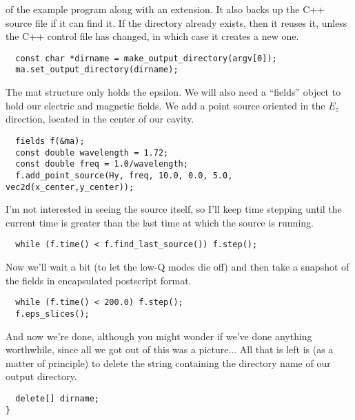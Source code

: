 of the example program along with an extension.  It also backs up the C++
source file if it can find it.  If the directory already exists, then it
reuses it, unless the C++ control file has changed, in which case it
creates a new one.
\begin{verbatim}
  const char *dirname = make_output_directory(argv[0]);
  ma.set_output_directory(dirname);
\end{verbatim}
The mat structure only holds the epsilon.  We will also need a ``fields''
object to hold our electric and magnetic fields.  We add a point source
oriented in the $E_z$ direction, located in the center of our cavity.
\begin{verbatim}
  fields f(&ma);
  const double wavelength = 1.72;
  const double freq = 1.0/wavelength;
  f.add_point_source(Hy, freq, 10.0, 0.0, 5.0, vec2d(x_center,y_center));
\end{verbatim}
I'm not interested in seeing the source itself, so I'll keep time stepping
until the current time is greater than the last time at which the source is
running.
\begin{verbatim}
  while (f.time() < f.find_last_source()) f.step();
\end{verbatim}
Now we'll wait a bit (to let the low-Q modes die off) and then take a
snapshot of the fields in encapsulated postscript format.
\begin{verbatim}
  while (f.time() < 200.0) f.step();
  f.eps_slices();
\end{verbatim}
And now we're done, although you might wonder if we've done anything
worthwhile, since all we got out of this was a picture... All that is left
is (as a matter of principle) to delete the string containing the directory
name of our output directory.
\begin{verbatim}
  delete[] dirname;
}
\end{verbatim}
